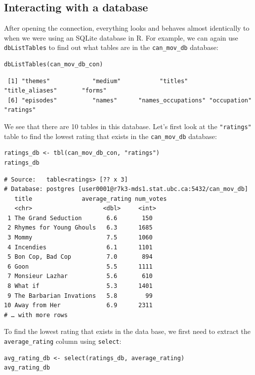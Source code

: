 \documentclass[
]{krantz}
\begin{document}
\hypertarget{interacting-with-a-database}{%
\subsection{Interacting with a database}\label{interacting-with-a-database}}

After opening the connection, everything looks and behaves almost identically to when we were using an SQLite database in R. For example, we can again
use \texttt{dbListTables} to find out what tables are in the \texttt{can\_mov\_db} database:

\begin{verbatim}
dbListTables(can_mov_db_con)
\end{verbatim}

\begin{verbatim}
 [1] "themes"            "medium"           "titles"     "title_aliases"       "forms"            
 [6] "episodes"          "names"      "names_occupations" "occupation"       "ratings" 
\end{verbatim}

We see that there are 10 tables in this database. Let's first look at the \texttt{"ratings"} table to find the lowest rating that exists in the \texttt{can\_mov\_db} database:

\begin{verbatim}
ratings_db <- tbl(can_mov_db_con, "ratings")
ratings_db
\end{verbatim}

\begin{verbatim}
# Source:   table<ratings> [?? x 3]
# Database: postgres [user0001@r7k3-mds1.stat.ubc.ca:5432/can_mov_db]
   title              average_rating num_votes
   <chr>                    <dbl>     <int>
 1 The Grand Seduction       6.6       150
 2 Rhymes for Young Ghouls   6.3      1685
 3 Mommy                     7.5      1060
 4 Incendies                 6.1      1101
 5 Bon Cop, Bad Cop          7.0       894
 6 Goon                      5.5      1111
 7 Monsieur Lazhar           5.6       610
 8 What if                   5.3      1401
 9 The Barbarian Invations   5.8        99
10 Away from Her             6.9      2311
# … with more rows
\end{verbatim}

To find the lowest rating that exists in the data base, we first need to extract the \texttt{average\_rating} column using \texttt{select}:

\begin{verbatim}
avg_rating_db <- select(ratings_db, average_rating)
avg_rating_db
\end{verbatim}
\end{document}
